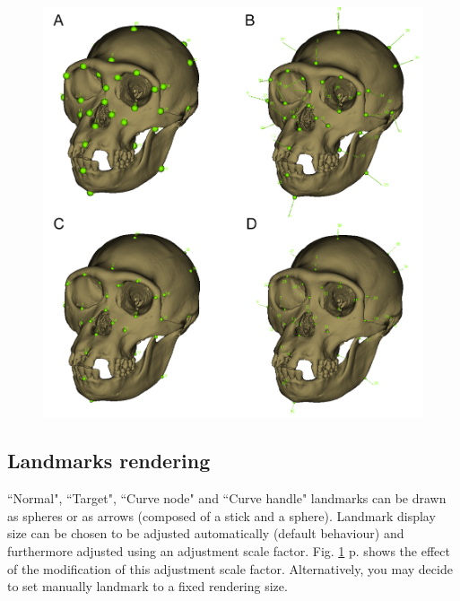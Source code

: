 \begin{figure}
  \centering  
 \includegraphics[scale=0.35]{images/08/landmark_rendering_option_example.png}
\label{landmarks_flags_option_example}
\end{figure}
\subsection{Landmarks rendering}

``Normal", ``Target", ``Curve node" and ``Curve handle" landmarks can be drawn as spheres or as arrows (composed of a stick and a sphere). Landmark display size can be chosen to be adjusted automatically (default behaviour) and furthermore adjusted using an adjustment scale factor. Fig.  \ref{landmarks_flags_option_example} p.\pageref{landmarks_flags_option_example} shows the effect of the modification of this adjustment scale factor. Alternatively, you may decide to set manually landmark to a fixed rendering size.






